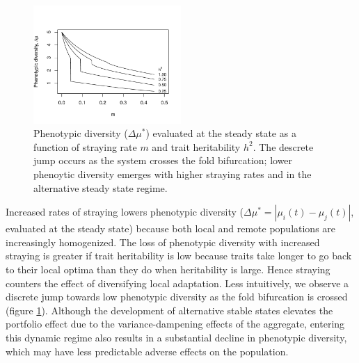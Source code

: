 \documentclass[twocolumn,preprintnumbers,amsmath,amssymb,superscriptaddress]{revtex4}
\begin{document}
\begin{figure}
  \captionsetup{justification=raggedright,
singlelinecheck=false
}
\centering
\includegraphics[width=0.5\textwidth]{figs2/fig_traitdiff.pdf}
\caption{
Phenotypic diversity ($\Delta \mu^*$) evaluated at the steady state as a function of straying rate $m$ and trait heritability $h^2$. The descrete jump occurs as the system crosses the fold bifurcation; lower phenoytic diversity emerges with higher straying rates and in the alternative steady state regime. 
} \label{fig:traitdiff}
\end{figure}

Increased rates of straying lowers phenotypic diversity ($\Delta \mu^* = |\mu_i(t)-\mu_j(t)|$, evaluated at the steady state) because both local and remote populations are increasingly homogenized.
The loss of phenotypic diversity with increased straying is greater if trait heritability is low because traits take longer to go back to their local optima than they do when heritability is large. 
Hence straying counters the effect of diversifying local adaptation. 
Less intuitively, we observe a discrete jump towards low phenotypic diversity as the fold bifurcation is crossed (figure \ref{fig:traitdiff}).
Although the development of alternative stable states elevates the portfolio effect due to the variance-dampening effects of the aggregate, entering this dynamic regime also results in a substantial decline in phenotypic diversity, which may have less predictable adverse effects on the population. 
\\

\end{document}
